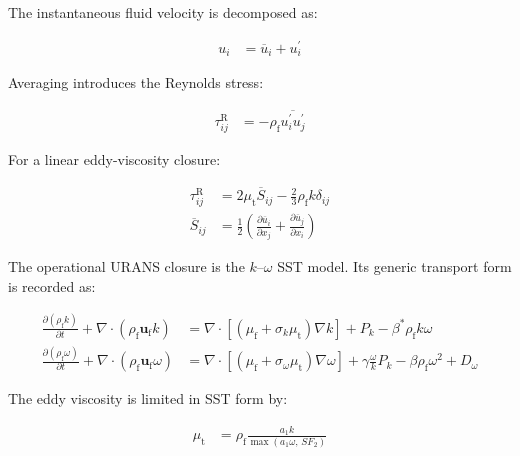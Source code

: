The instantaneous fluid velocity is decomposed as:

\begin{align}
  u_i
  &=
  \overline{u}_i
  +
  u_i^{\prime}
  \label{eq:res-mod-src-urans-velocity-decomposition}
\end{align}

Averaging introduces the Reynolds stress:

\begin{align}
  \tau_{ij}^{\mathrm{R}}
  &=
  -\rho_{\mathrm{f}}
  \overline{
    u_i^{\prime}u_j^{\prime}
  }
  \label{eq:res-mod-src-urans-reynolds-stress}
\end{align}

For a linear eddy-viscosity closure:

\begin{align}
  \tau_{ij}^{\mathrm{R}}
  &=
  2\mu_{\mathrm{t}}
  \overline{S}_{ij}
  -
  \frac{2}{3}
  \rho_{\mathrm{f}}k\delta_{ij}
  \label{eq:res-mod-src-urans-boussinesq-closure}
  \\
  \overline{S}_{ij}
  &=
  \frac{1}{2}
  \left(
    \frac{\partial\overline{u}_i}{\partial x_j}
    +
    \frac{\partial\overline{u}_j}{\partial x_i}
  \right)
  \label{eq:res-mod-src-urans-strain-rate}
\end{align}

The operational URANS closure is the $k$--$\omega$ SST model. Its
generic transport form is recorded as:

\begin{align}
  \frac{\partial\left(\rho_{\mathrm{f}} k\right)}{\partial t}
  +
  \nabla\cdot
  \left(
    \rho_{\mathrm{f}}\mathbf{u}_{\mathrm{f}} k
  \right)
  &=
  \nabla\cdot
  \left[
    \left(
      \mu_{\mathrm{f}}
      +
      \sigma_k\mu_{\mathrm{t}}
    \right)
    \nabla k
  \right]
  +
  P_k
  -
  \beta^{*}\rho_{\mathrm{f}}k\omega
  \label{eq:res-mod-src-sst-k-equation}
  \\
  \frac{\partial\left(\rho_{\mathrm{f}}\omega\right)}{\partial t}
  +
  \nabla\cdot
  \left(
    \rho_{\mathrm{f}}\mathbf{u}_{\mathrm{f}}\omega
  \right)
  &=
  \nabla\cdot
  \left[
    \left(
      \mu_{\mathrm{f}}
      +
      \sigma_{\omega}\mu_{\mathrm{t}}
    \right)
    \nabla\omega
  \right]
  +
  \gamma
  \frac{\omega}{k}
  P_k
  -
  \beta\rho_{\mathrm{f}}\omega^2
  +
  D_{\omega}
  \label{eq:res-mod-src-sst-omega-equation}
\end{align}

The eddy viscosity is limited in SST form by:

\begin{align}
  \mu_{\mathrm{t}}
  &=
  \rho_{\mathrm{f}}
  \frac{
    a_1 k
  }{
    \max
    \left(
      a_1\omega,\,
      S F_2
    \right)
  }
  \label{eq:res-mod-src-sst-eddy-viscosity}
\end{align}

